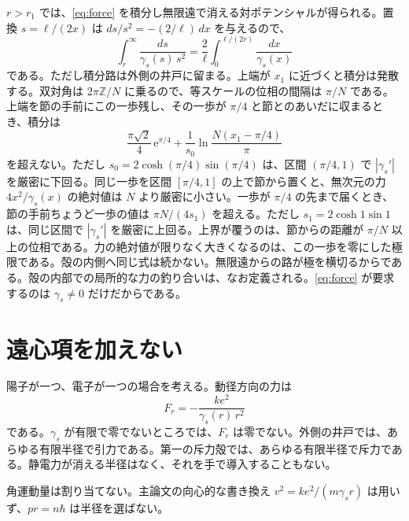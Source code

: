 \documentclass[a4paper]{article}
\begin{document}
\(r>r_1\) では、\eqref{eq:force} を積分し無限遠で消える対ポテンシャルが得られる。置換 \(s=\ell/(2x)\) は \(ds/s^{2}=-(2/\ell)\,dx\) を与えるので、
\begin{equation}
\label{eq:potential}
\int_r^{\infty}\frac{ds}{\gamma_s(s)\,s^{2}}
  =\frac{2}{\ell}\int_0^{\ell/(2r)}\frac{dx}{\gamma_s(x)}
\end{equation}
である。ただし積分路は外側の井戸に留まる。上端が \(x_1\) に近づくと積分は発散する。双対角は \(2\pi\mathbb{Z}/N\) に乗るので、等スケールの位相の間隔は \(\pi/N\) である。上端を節の手前にこの一歩残し、その一歩が \(\pi/4\) と節とのあいだに収まるとき、積分は
\[
\frac{\pi\sqrt{2}}{4}\,\mathrm{e}^{\pi/4}
  +\frac{1}{s_0}\ln\frac{N(x_1-\pi/4)}{\pi}
\]
を超えない。ただし \(s_0=2\cosh(\pi/4)\sin(\pi/4)\) は、区間 \((\pi/4,1)\) で \(|\gamma_s'|\) を厳密に下回る。同じ一歩を区間 \([\pi/4,1]\) の上で節から置くと、無次元の力 \(4x^{2}/\gamma_s(x)\) の絶対値は \(N\) より厳密に小さい。一歩が \(\pi/4\) の先まで届くとき、節の手前ちょうど一歩の値は \(\pi N/(4s_1)\) を超える。ただし \(s_1=2\cosh 1\sin 1\) は、同じ区間で \(|\gamma_s'|\) を厳密に上回る。上界が覆うのは、節からの距離が \(\pi/N\) 以上の位相である。力の絶対値が限りなく大きくなるのは、この一歩を零にした極限である。殻の内側へ同じ式は続かない。無限遠からの路が極を横切るからである。殻の内部での局所的な力の釣り合いは、なお定義される。\eqref{eq:force} が要求するのは \(\gamma_s\neq 0\) だけだからである。

\section{遠心項を加えない}
\label{sec:nocent}

陽子が一つ、電子が一つの場合を考える。動径方向の力は
\[
F_r=-\frac{k e^{2}}{\gamma_s(r)\,r^{2}}
\]
である。\(\gamma_s\) が有限で零でないところでは、\(F_r\) は零でない。外側の井戸では、あらゆる有限半径で引力である。第一の斥力殻では、あらゆる有限半径で斥力である。静電力が消える半径はなく、それを手で導入することもない。

角運動量は割り当てない。主論文の向心的な書き換え \(v^{2}=k e^{2}/(m\gamma_s r)\) は用いず、\(pr=n\hbar\) は半径を選ばない。
\end{document}
